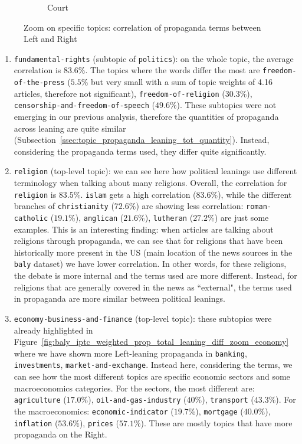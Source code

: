 \begin{figure}[!htbp]
\begin{subfigure}{0.45\textwidth}
		\caption{Court}
            \label{fig:baly_iptc_weighted_prop_leaning_corr_tfidf_zoom_court}
	\end{subfigure}
	
    \caption{Zoom on specific topics: correlation of propaganda terms between Left and Right}
    \label{fig:baly_iptc_weighted_prop_leaning_corr_tfidf_zoom}
\end{figure}

\begin{enumerate}
    \item \texttt{fundamental-rights} (subtopic of \texttt{politics}): on the whole topic, the average correlation is $83.6\%$. The topics where the words differ the most are \texttt{freedom-of-the-press} ($5.5\%$ but very small with a sum of topic weights of 4.16 articles, therefore not significant), \texttt{freedom-of-religion} ($30.3\%$), \texttt{censorship-and-freedom-of-speech} ($49.6\%$). These subtopics were not emerging in our previous analysis, therefore the quantities of propaganda across leaning are quite similar (Subsection~\ref{ssec:topic_propaganda_leaning_tot_quantity}). Instead, considering the propaganda terms used, they differ quite significantly.
    \item \texttt{religion} (top-level topic): we can see here how political leanings use different terminology when talking about many religions. Overall, the correlation for \texttt{religion} is $83.5\%$. \texttt{islam} gets a high correlation ($83.6\%$), while the different branches of \texttt{christianity} ($72.6\%$) are showing less correlation: \texttt{roman-catholic} ($19.1\%$), \texttt{anglican} ($21.6\%$), \texttt{lutheran} ($27.2\%$) are just some examples. This is an interesting finding: when articles are talking about religions through propaganda, we can see that for religions that have been historically more present in the US (main location of the news sources in the \texttt{baly} dataset) we have lower correlation. In other words, for these religions, the debate is more internal and the terms used are more different. Instead, for religions that are generally covered in the news as ``external", the terms used in propaganda are more similar between political leanings.
    \item \texttt{economy-business-and-finance} (top-level topic): these subtopics were already highlighted in Figure~\ref{fig:baly_iptc_weighted_prop_total_leaning_diff_zoom_economy} where we have shown more Left-leaning propaganda in \texttt{banking}, \texttt{investments}, \texttt{market-and-exchange}. Instead here, considering the terms, we can see how the most different topics are specific economic sectors and some macroeconomics categories. For the sectors, the most different are: \texttt{agriculture} ($17.0\%$), \texttt{oil-and-gas-industry} ($40\%$), \texttt{transport} ($43.3\%$). For the macroeconomics: \texttt{economic-indicator} ($19.7\%$), \texttt{mortgage} ($40.0\%$), \texttt{inflation} ($53.6\%$), \texttt{prices} ($57.1\%$). These are mostly topics that have more propaganda on the Right.

\end{enumerate}
